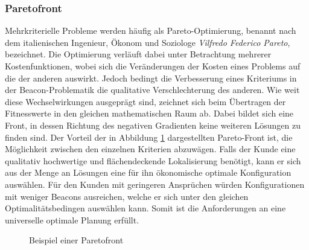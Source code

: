\subsubsection{Paretofront}
Mehrkriterielle Probleme werden häufig als Pareto-Optimierung, benannt nach dem italienischen Ingenieur, Ökonom und Soziologe \textit{Vilfredo Federico Pareto}, bezeichnet. Die Optimierung verläuft dabei unter Betrachtung mehrerer Kostenfunktionen, wobei sich die Veränderungen der Kosten eines Problems auf die der anderen auswirkt. Jedoch bedingt die Verbesserung eines Kriteriums in der Beacon-Problematik die qualitative Verschlechterung des anderen. Wie weit diese Wechselwirkungen ausgeprägt sind, zeichnet sich beim Übertragen der Fitnesswerte in den gleichen mathematischen Raum ab. Dabei bildet sich eine Front, in dessen Richtung des negativen Gradienten keine weiteren Lösungen zu finden sind. Der Vorteil der in Abbildung \ref{fig:Paretofront} dargestellten Pareto-Front ist, die Möglichkeit zwischen den einzelnen Kriterien abzuwägen. Falls der Kunde eine qualitativ hochwertige und flächendeckende Lokalisierung benötigt, kann er sich aus der Menge an Lösungen eine für ihn ökonomische optimale Konfiguration auswählen. Für den Kunden mit geringeren Ansprüchen würden Konfigurationen mit weniger Beacons ausreichen, welche er sich unter den gleichen Optimalitätsbedingen auswählen kann. Somit ist die Anforderungen an eine universelle optimale Planung erfüllt.
\begin{figure}[H] 
\centering
{}
\caption{Beispiel einer Paretofront}
\label{fig:Paretofront}
\end{figure}
